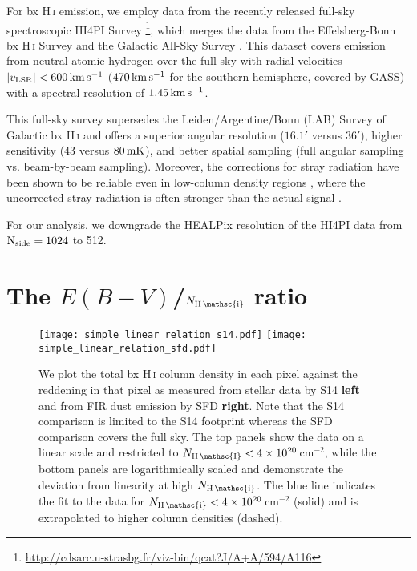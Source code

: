\documentclass[iop,apj]{emulateapj}
\makeatletter
\def\testbx{bx}%
\DeclareRobustCommand{\ion}[2]{%
\relax\ifmmode
\ifx\testbx\f@series
{\mathbf{#1\,\mathsc{#2}}}\else
{\mathrm{#1\,\mathsc{#2}}}\fi
\else\textup{#1\,{\mdseries\textsc{#2}}}%
\fi}
\makeatother
\begin{document}
For \ion{H}{i} emission, we employ data from the recently released full-sky spectroscopic HI4PI Survey \citep{Hi4pi_2016}\footnote{\url{http://cdsarc.u-strasbg.fr/viz-bin/qcat?J/A+A/594/A116}}, which merges the data from the Effelsberg-Bonn \ion{H}{i} Survey \citep[EBHIS,][]{Winkel+etal_2010, Kerp+etal_2011, Winkel+etal_2016} and the Galactic All-Sky Survey \citep[GASS,][]{Mcclure-Griffiths+etal_2009, Kalberla+etal_2010, Kalberla+Haud_2015}. This dataset covers emission from neutral atomic hydrogen over the full sky with radial velocities $|v_{\rm LSR}| < 600\,\rm km\,s^{-1}$ ($470\,\rm km\,s^{-1}$ for the southern hemisphere, covered by GASS) with a spectral resolution of $1.45\,\rm km\,s^{-1}$.

This full-sky survey supersedes the Leiden/Argentine/Bonn (LAB) Survey of Galactic \ion{H}{i} \citep{Kalberla+etal_2005} and offers a superior angular resolution ($16.1'$ versus $36'$), higher sensitivity (43 versus $80\,\rm mK$), and better spatial sampling (full angular sampling vs. beam-by-beam sampling). Moreover, the corrections for stray radiation have been shown to be reliable even in low-column density regions \citep{Martin+etal_2015}, where the uncorrected stray radiation is often stronger than the actual signal \citep[][Figures~1 and A.2]{Winkel+etal_2016}.

For our analysis, we downgrade the HEALPix resolution of the HI4PI data from $\rm N_{side}=1024$ to 512.

\section{The $E(B-V)$/$N_\ion{H}{i}$ ratio}
\label{sec:hi_ebv}

\begin{figure*}[tp]
	\texttt{[image: simple\_linear\_relation\_s14.pdf]}
    \texttt{[image: simple\_linear\_relation\_sfd.pdf]}
	\caption{We plot the total \ion{H}{i} column density in each pixel against the reddening in that pixel as measured from stellar data by S14 \textbf{left} and from FIR dust emission by SFD \textbf{right}. Note that the S14 comparison is limited to the S14 footprint whereas the SFD comparison covers the full sky. The top panels show the data on a linear scale and restricted to $N_\ion{H}{I} < 4\times10^{20}$\,cm$^{-2}$, while the bottom panels are logarithmically scaled and demonstrate the deviation from linearity at high $N_\ion{H}{i}$. The blue line indicates the fit to the data for $N_\ion{H}{i} < 4\times10^{20}$\,cm$^{-2}$ (solid) and is extrapolated to higher column densities (dashed).}
	\label{fig:ebv_vs_nhi}
\end{figure*}
\end{document}
